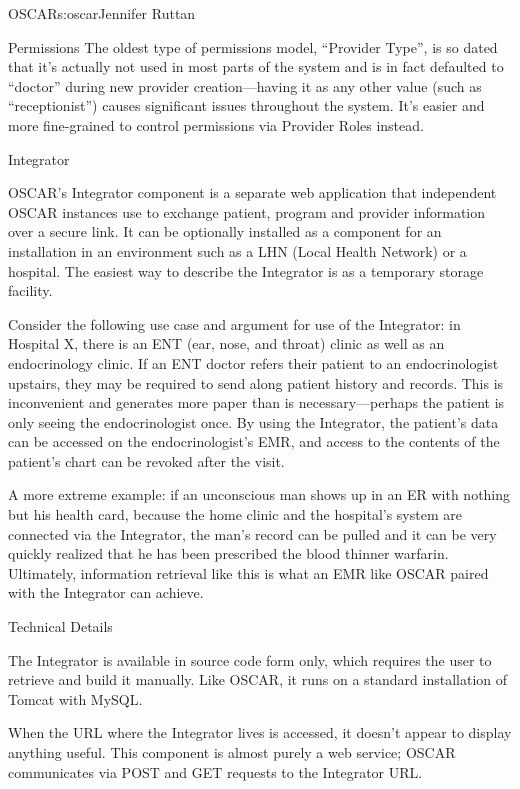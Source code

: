 \begin{aosachapter}{OSCAR}{s:oscar}{Jennifer Ruttan}
\begin{aosasect1}{Permissions}
The oldest type of permissions model, ``Provider Type'', is so dated
that it's actually not used in most parts of the system and is in fact
defaulted to ``doctor'' during new provider creation---having it as
any other value (such as ``receptionist'') causes significant issues
throughout the system. It's easier and more fine-grained to control
permissions via Provider Roles instead.

\end{aosasect1}

\begin{aosasect1}{Integrator}

OSCAR's Integrator component is a separate web application that
independent OSCAR instances use to exchange patient, program and
provider information over a secure link. It can be optionally
installed as a component for an installation in an environment such as
a LHN (Local Health Network) or a hospital. The easiest way to describe the Integrator is as
a temporary storage facility.

Consider the following use case and argument for use of the
Integrator: in Hospital X, there is an ENT (ear, nose, and throat)
clinic as well as an endocrinology clinic. If an ENT doctor refers
their patient to an endocrinologist upstairs, they may be required to
send along patient history and records. This is inconvenient and
generates more paper than is necessary---perhaps the patient is only
seeing the endocrinologist once. By using the Integrator, the
patient's data can be accessed on the endocrinologist's EMR, and
access to the contents of the patient's chart can be revoked after the
visit.

A more extreme example: if an unconscious man shows up in an ER with
nothing but his health card, because the home clinic and the
hospital's system are connected via the Integrator, the man's record
can be pulled and it can be very quickly realized that he has been
prescribed the blood thinner warfarin. Ultimately, information
retrieval like this is what an EMR like OSCAR paired with the
Integrator can achieve.

\begin{aosasect2}{Technical Details}

The Integrator is available in source code form only, which requires
the user to retrieve and build it manually. Like OSCAR, it runs on a
standard installation of Tomcat with MySQL.

When the URL where the Integrator lives is accessed, it doesn't appear
to display anything useful. This component is almost purely a web
service; OSCAR communicates via POST and GET requests to the
Integrator URL.


\end{aosasect2}
\end{aosasect1}
\end{aosachapter}

